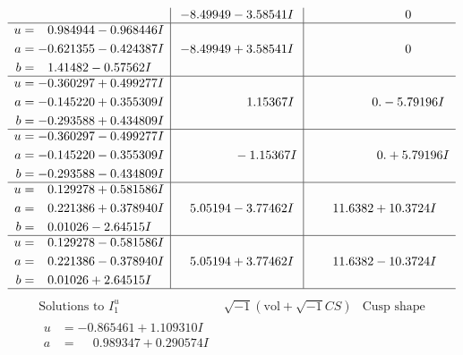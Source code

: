 \documentclass[1p]{elsarticle_modified}
\theoremstyle{definition}
\newcommand{\I}{\sqrt{-1}}
\begin{document}
$$\begin{array}{c|c|c}
 & -8.49949 - 3.58541 I & \phantom{-0.000000 } 0 \\ \hline\begin{aligned}
u &= \phantom{-}0.984944 - 0.968446 I \\
a &= -0.621355 - 0.424387 I \\
b &= \phantom{-}1.41482 - 0.57562 I\end{aligned}
 & -8.49949 + 3.58541 I & \phantom{-0.000000 } 0 \\ \hline\begin{aligned}
u &= -0.360297 + 0.499277 I \\
a &= -0.145220 + 0.355309 I \\
b &= -0.293588 + 0.434809 I\end{aligned}
 & \phantom{-0.000000 -}1.15367 I & \phantom{-0.000000 } 0. - 5.79196 I \\ \hline\begin{aligned}
u &= -0.360297 - 0.499277 I \\
a &= -0.145220 - 0.355309 I \\
b &= -0.293588 - 0.434809 I\end{aligned}
 & \phantom{-0.000000 } -1.15367 I & \phantom{-0.000000 -}0. + 5.79196 I \\ \hline\begin{aligned}
u &= \phantom{-}0.129278 + 0.581586 I \\
a &= \phantom{-}0.221386 + 0.378940 I \\
b &= \phantom{-}0.01026 - 2.64515 I\end{aligned}
 & \phantom{-}5.05194 - 3.77462 I & \phantom{-}11.6382 + 10.3724 I \\ \hline\begin{aligned}
u &= \phantom{-}0.129278 - 0.581586 I \\
a &= \phantom{-}0.221386 - 0.378940 I \\
b &= \phantom{-}0.01026 + 2.64515 I\end{aligned}
 & \phantom{-}5.05194 + 3.77462 I & \phantom{-}11.6382 - 10.3724 I\\
 \hline 
 \end{array}$$\newpage$$\begin{array}{c|c|c}  
\text{Solutions to }I^u_{1}& \I (\text{vol} + \sqrt{-1}CS) & \text{Cusp shape}\\
 \hline 
\begin{aligned}
u &= -0.865461 + 1.109310 I \\
a &= \phantom{-}0.989347 + 0.290574 I \\

\end{aligned}
\end{array}$$
\end{document}

